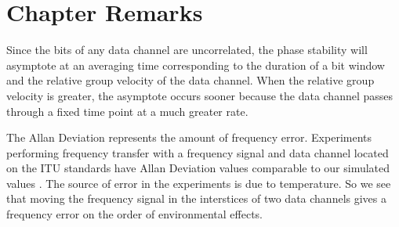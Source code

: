 \section{Chapter Remarks}

Since the bits of any data channel are uncorrelated, the phase stability will asymptote at an averaging time corresponding to the duration of a bit window and the relative group velocity of the data channel. When the relative group velocity is greater, the asymptote occurs sooner because the data channel passes through a fixed time point at a much greater rate. 

The Allan Deviation represents the amount of frequency error. Experiments performing frequency transfer with a frequency signal and data channel located on the ITU standards have Allan Deviation values comparable to our simulated values \cite{Serrano2013} \cite{cantin2017progress}. The source of error in the experiments is due to temperature. So we see that moving the frequency signal in the interstices of two data channels gives a frequency error on the order of environmental effects.